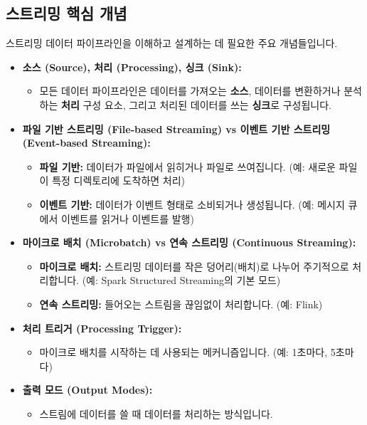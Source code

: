 \documentclass[11pt,a4paper]{article}
\theoremstyle{definition}
\begin{document}
\subsection{스트리밍 핵심 개념}

스트리밍 데이터 파이프라인을 이해하고 설계하는 데 필요한 주요 개념들입니다.

\begin{itemize}
    \item \textbf{소스 (Source), 처리 (Processing), 싱크 (Sink):}
    \begin{itemize}
        \item 모든 데이터 파이프라인은 데이터를 가져오는 \textbf{소스}, 데이터를 변환하거나 분석하는 \textbf{처리} 구성 요소, 그리고 처리된 데이터를 쓰는 \textbf{싱크}로 구성됩니다.
    \end{itemize}
    \item \textbf{파일 기반 스트리밍 (File-based Streaming) vs 이벤트 기반 스트리밍 (Event-based Streaming):}
    \begin{itemize}
        \item \textbf{파일 기반:} 데이터가 파일에서 읽히거나 파일로 쓰여집니다. (예: 새로운 파일이 특정 디렉토리에 도착하면 처리)
        \item \textbf{이벤트 기반:} 데이터가 이벤트 형태로 소비되거나 생성됩니다. (예: 메시지 큐에서 이벤트를 읽거나 이벤트를 발행)
    \end{itemize}
    \item \textbf{마이크로 배치 (Microbatch) vs 연속 스트리밍 (Continuous Streaming):}
    \begin{itemize}
        \item \textbf{마이크로 배치:} 스트리밍 데이터를 작은 덩어리(배치)로 나누어 주기적으로 처리합니다. (예: Spark Structured Streaming의 기본 모드)
        \item \textbf{연속 스트리밍:} 들어오는 스트림을 끊임없이 처리합니다. (예: Flink)
    \end{itemize}
    \item \textbf{처리 트리거 (Processing Trigger):}
    \begin{itemize}
        \item 마이크로 배치를 시작하는 데 사용되는 메커니즘입니다. (예: 1초마다, 5초마다)
    \end{itemize}
    \item \textbf{출력 모드 (Output Modes):}
    \begin{itemize}
        \item 스트림에 데이터를 쓸 때 데이터를 처리하는 방식입니다.

\end{itemize}
\end{itemize}
\end{document}
